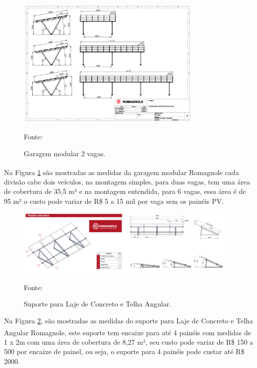 \begin{figure}[H]
    \centering
    \includegraphics[width=0.8\textwidth]{./Figuras/romagnole_estrutura.png}
    \caption{Garagem modular 2 vagas.}{Fonte: \cite{romagnole_garagem}}
   \label{fig:romagnole_estrutura}
\end{figure}

Na Figura \ref{fig:romagnole_estrutura} são mostradas as medidas da garagem modular Romagnole \textsuperscript{\textregistered} cada divisão cabe dois veículos, na montagem simples, para duas vagas, tem uma área de cobertura de 35,5 m² e na montagem entendida, para 6 vagas, essa área é de 95 m² o custo pode variar de R\$ 5 a 15 mil por vaga sem os painéis PV.

\begin{figure}[H]
    \centering
    \includegraphics[width=0.95\textwidth]{./Figuras/laje_estrutura.png}
    \caption{Suporte para Laje de Concreto e Telha Angular.}{Fonte: \cite{romagnole_laje}}
   \label{fig:laje_estrutura}
\end{figure}

Na Figura \ref{fig:laje_estrutura}, são mostradas as medidas do suporte para Laje de Concreto e Telha Angular Romagnole\textsuperscript{\textregistered}, este suporte tem encaixe para até 4 painéis com medidas de 1 x 2m com uma área de cobertura de 8,27 m², seu custo pode variar de R\$ 150 a 500 por encaixe de painel, ou seja, o suporte para 4 painéis pode custar até R\$ 2000.

